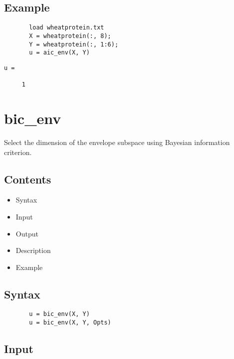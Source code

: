 \documentclass[a4paper,11pt,openany]{memoir}
\begin{document}
\subsection*{Example}


\begin{verbatim}       load wheatprotein.txt
       X = wheatprotein(:, 8);
       Y = wheatprotein(:, 1:6);
       u = aic_env(X, Y)\end{verbatim}
    
        \color{lightgray}\ttfamily \begin{verbatim}
u =

     1

\end{verbatim} \rmfamily
\color{black}
    
 

\newpage

\rmfamily
\color{black}\section{bic\_env}

\begin{par}
Select the dimension of the envelope subspace using Bayesian information criterion.
\end{par} \vspace{1em}

\subsection*{Contents}

\begin{itemize}
\setlength{\itemsep}{-1ex}
   \item Syntax
   \item Input
   \item Output
   \item Description
   \item Example
\end{itemize}


\subsection*{Syntax}


\begin{verbatim}       u = bic_env(X, Y)
       u = bic_env(X, Y, Opts)\end{verbatim}
    

\subsection*{Input}
\end{document}
